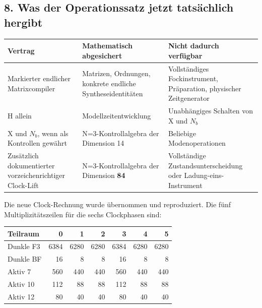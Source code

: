 \subsection{8. Was der Operationssatz jetzt tatsächlich
hergibt}\label{was-der-operationssatz-jetzt-tatsuxe4chlich-hergibt}

{\def\LTcaptype{none} %
\begin{longtable}[]{@{}
  >{\raggedright\arraybackslash}p{}
  >{\raggedright\arraybackslash}p{}
  >{\raggedright\arraybackslash}p{}@{}}
\toprule\noalign{}
\begin{minipage}[b]{\linewidth}\raggedright
Vertrag
\end{minipage} & \begin{minipage}[b]{\linewidth}\raggedright
Mathematisch abgesichert
\end{minipage} & \begin{minipage}[b]{\linewidth}\raggedright
Nicht dadurch verfügbar
\end{minipage} \\
\midrule\noalign{}
\endhead
\bottomrule\noalign{}
\endlastfoot
Markierter endlicher Matrixcompiler & Matrizen, Ordnungen, konkrete
endliche Syntheseidentitäten & Vollständiges Fockinstrument,
Präparation, physischer Zeitgenerator \\
H allein & Modellzeitentwicklung & Unabhängiges Schalten von X und
\(N_b\) \\
X und \(N_b\), wenn als Kontrollen gewährt & N=3-Kontrollalgebra der
Dimension 14 & Beliebige Modenoperationen \\
Zusätzlich dokumentierter vorzeichenrichtiger Clock-Lift &
N=3-Kontrollalgebra der Dimension \textbf{84} & Vollständige
Zustandsunterscheidung oder Ladung-eins-Instrument \\
\end{longtable}
}

Die neue Clock-Rechnung wurde übernommen und reproduziert. Die fünf
Multiplizitätszeilen für die sechs Clockphasen sind:

{\def\LTcaptype{none} %
\begin{longtable}[]{@{}lrrrrrr@{}}
\toprule\noalign{}
Teilraum & 0 & 1 & 2 & 3 & 4 & 5 \\
\midrule\noalign{}
\endhead
\bottomrule\noalign{}
\endlastfoot
Dunkle F3 & 6384 & 6280 & 6280 & 6384 & 6280 & 6280 \\
Dunkle BF & 16 & 8 & 8 & 16 & 8 & 8 \\
Aktiv 7 & 560 & 440 & 440 & 560 & 440 & 440 \\
Aktiv 10 & 112 & 88 & 88 & 112 & 88 & 88 \\
Aktiv 12 & 80 & 40 & 40 & 80 & 40 & 40 \\
\end{longtable}
}


